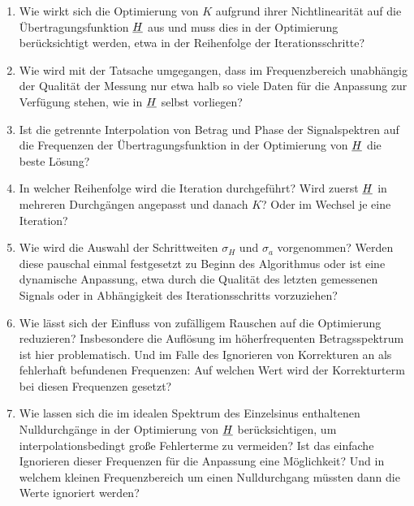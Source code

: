 \documentclass[../Report.tex]{subfiles}
\begin{document}
\begin{enumerate}
	\item 	Wie wirkt sich die Optimierung von $K$ aufgrund ihrer Nichtlinearität auf die Übertragungsfunktion $\underline{H}$ aus und muss dies in der Optimierung berücksichtigt werden, etwa in der Reihenfolge der Iterationsschritte?
	
	\item	Wie wird mit der Tatsache umgegangen, dass im Frequenzbereich unabhängig der Qualität der Messung nur etwa halb so viele Daten für die Anpassung zur Verfügung stehen, wie in $\underline{H}$ selbst vorliegen?
	
	\item 	Ist die getrennte Interpolation von Betrag und Phase der Signalspektren auf die Frequenzen der Übertragungsfunktion in der Optimierung von $\underline{H}$ die beste Lösung? 
	
	\item	In welcher Reihenfolge wird die Iteration durchgeführt? Wird zuerst $\underline{H}$ in mehreren Durchgängen angepasst und danach $K$? Oder im Wechsel je eine Iteration?
	
	\item 	Wie wird die Auswahl der Schrittweiten $\sigma_H$ und $\sigma_a$ vorgenommen? Werden diese pauschal einmal festgesetzt zu Beginn des Algorithmus oder ist eine dynamische Anpassung, etwa durch die Qualität des letzten gemessenen Signals oder in Abhängigkeit des Iterationsschritts vorzuziehen? 
	
	\item 	Wie lässt sich der Einfluss von zufälligem Rauschen auf die Optimierung reduzieren? Insbesondere die Auflösung im höherfrequenten Betragsspektrum ist hier problematisch. Und im Falle des Ignorieren von Korrekturen an als fehlerhaft befundenen Frequenzen: Auf welchen Wert wird der Korrekturterm bei diesen Frequenzen gesetzt?
	
	\item	Wie lassen sich die im idealen Spektrum des Einzelsinus enthaltenen Nulldurchgänge in der Optimierung von $\underline{H}$ berücksichtigen, um interpolationsbedingt große Fehlerterme zu vermeiden? Ist das einfache Ignorieren dieser Frequenzen für die Anpassung eine Möglichkeit? Und in welchem kleinen Frequenzbereich um einen Nulldurchgang müssten dann die Werte ignoriert werden?
	
	

\end{enumerate}
\end{document}
